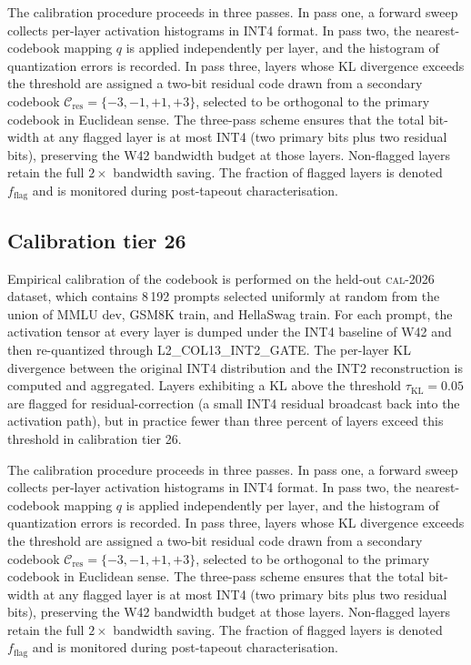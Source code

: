 The calibration procedure proceeds in three passes. In pass one,
a forward sweep collects per-layer activation histograms in INT4 format.
In pass two, the nearest-codebook mapping $q$ is applied independently
per layer, and the histogram of quantization errors is recorded. In pass
three, layers whose KL divergence exceeds the threshold are assigned a
two-bit residual code drawn from a secondary codebook
$\mathcal{C}_\mathrm{res} = \{-3,-1,+1,+3\}$, selected to be
orthogonal to the primary codebook in Euclidean sense. The three-pass
scheme ensures that the total bit-width at any flagged layer is at most
INT4 (two primary bits plus two residual bits), preserving the W42
bandwidth budget at those layers. Non-flagged layers retain the full
$2\times$ bandwidth saving. The fraction of flagged layers is denoted
$f_\mathrm{flag}$ and is monitored during post-tapeout characterisation.


\subsection{Calibration tier 26}

Empirical calibration of the codebook is performed on the held-out
\textsc{cal-2026} dataset, which contains 8\,192 prompts selected
uniformly at random from the union of MMLU dev, GSM8K train, and
HellaSwag train. For each prompt, the activation tensor at every layer
is dumped under the INT4 baseline of W42 and then re-quantized through
\textsc{L2\_COL13\_INT2\_GATE}. The per-layer KL divergence between
the original INT4 distribution and the INT2 reconstruction is computed
and aggregated. Layers exhibiting a KL above the threshold
$\tau_{\mathrm{KL}} = 0.05$ are flagged for residual-correction (a
small INT4 residual broadcast back into the activation path), but in
practice fewer than three percent of layers exceed this threshold in
calibration tier 26.

The calibration procedure proceeds in three passes. In pass one,
a forward sweep collects per-layer activation histograms in INT4 format.
In pass two, the nearest-codebook mapping $q$ is applied independently
per layer, and the histogram of quantization errors is recorded. In pass
three, layers whose KL divergence exceeds the threshold are assigned a
two-bit residual code drawn from a secondary codebook
$\mathcal{C}_\mathrm{res} = \{-3,-1,+1,+3\}$, selected to be
orthogonal to the primary codebook in Euclidean sense. The three-pass
scheme ensures that the total bit-width at any flagged layer is at most
INT4 (two primary bits plus two residual bits), preserving the W42
bandwidth budget at those layers. Non-flagged layers retain the full
$2\times$ bandwidth saving. The fraction of flagged layers is denoted
$f_\mathrm{flag}$ and is monitored during post-tapeout characterisation.


